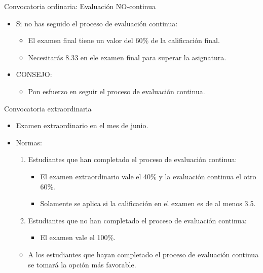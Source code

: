 \begin{frame}[t]{Convocatoria ordinaria: Evaluación NO-continua}
\begin{itemize}
  \item Si no has seguido el proceso de evaluación continua:
    \begin{itemize}
      \item El examen final tiene un valor del 60\% de la calificación final.
      \item Necesitarás 8.33 en ele examen final para superar la asignatura.
    \end{itemize}

  \item \alert{CONSEJO}:
    \begin{itemize}
      \item Pon esfuerzo en seguir el proceso de evaluación continua.
    \end{itemize}
\end{itemize}
\end{frame}


\begin{frame}[t]{Convocatoria extraordinaria}
\begin{itemize}
  \item Examen extraordinario en el mes de junio.
  \vspace{1em}
  \item Normas:
    \begin{enumerate}
      \item Estudiantes que han completado el proceso de evaluación continua:
        \begin{itemize}
          \item El examen extraordinario vale el 40\% y la evaluación continua el otro 60\%.
          \item Solamente se aplica si la calificación en el examen es de al menos 3.5.
        \end{itemize}
      \item Estudiantes que no han completado el proceso de evaluación continua:
        \begin{itemize}
          \item El examen vale el 100\%.
        \end{itemize}
    \end{enumerate}
    \begin{itemize}
      \item A los estudiantes que hayan completado el proceso de evaluación continua se tomará la opción más favorable.
    \end{itemize}
\end{itemize}
\end{frame}

